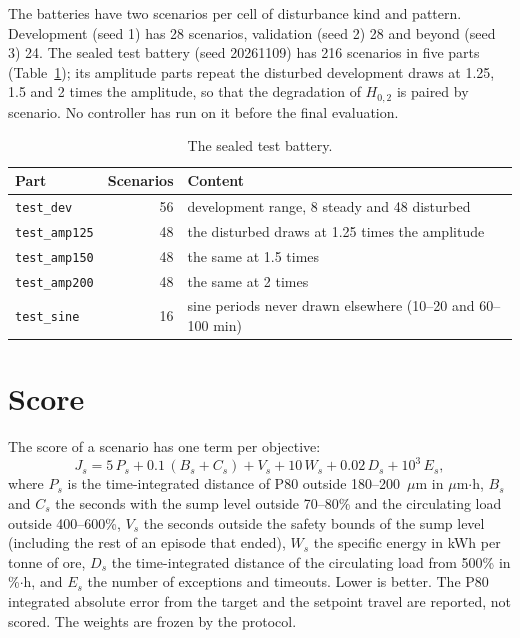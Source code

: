 The batteries have two scenarios per cell of disturbance kind and pattern.
Development (seed 1) has 28 scenarios, validation (seed 2) 28 and beyond
(seed 3) 24. The sealed test battery (seed 20261109) has 216 scenarios in five
parts (Table~\ref{tab:mill-sealed}); its amplitude parts repeat the disturbed
development draws at 1.25, 1.5 and 2 times the amplitude, so that the
degradation of $H_{0,2}$ is paired by scenario. No controller has run on it
before the final evaluation.

\begin{table}[tb]
  \centering
  \caption{The sealed test battery.}
  \label{tab:mill-sealed}
  \small
  \begin{tabular}{@{}lrp{}@{}}
    \toprule
    Part & Scenarios & Content \\
    \midrule
    \texttt{test\_dev}    & 56 & development range, 8 steady and 48 disturbed \\
    \texttt{test\_amp125} & 48 & the disturbed draws at 1.25 times the amplitude \\
    \texttt{test\_amp150} & 48 & the same at 1.5 times \\
    \texttt{test\_amp200} & 48 & the same at 2 times \\
    \texttt{test\_sine}   & 16 & sine periods never drawn elsewhere (10--20 and 60--100 min) \\
    \bottomrule
  \end{tabular}
\end{table}

\section{Score}
\label{sec:mill-score}
The score of a scenario has one term per objective:
\begin{equation}
  J_s = 5\,P_s + 0.1\,(B_s + C_s) + V_s + 10\,W_s + 0.02\,D_s + 10^3\,E_s ,
  \label{eq:mill-score}
\end{equation}
where $P_s$ is the time-integrated distance of P80 outside 180--200~$\mu$m in
$\mu$m$\cdot$h, $B_s$ and $C_s$ the seconds with the sump level outside
70--80\% and the circulating load outside 400--600\%, $V_s$ the seconds outside
the safety bounds of the sump level (including the rest of an episode that
ended), $W_s$ the specific energy in kWh per tonne of ore, $D_s$ the
time-integrated distance of the circulating load from 500\% in \%$\cdot$h, and
$E_s$ the number of exceptions and timeouts. Lower is better. The P80
integrated absolute error from the target and the setpoint travel are
reported, not scored. The weights are frozen by the protocol.

